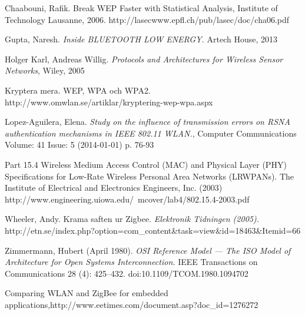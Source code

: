 \documentclass[a4paper,12pt,fleqn]{article}
\begin{document}
Chaabouni, Rafik. Break WEP Faster with Statistical Analysis, Institute of Technology Lausanne, 2006. http://lasecwww.epfl.ch/pub/lasec/doc/cha06.pdf

Gupta, Naresh. \emph{Inside BLUETOOTH LOW ENERGY.} Artech House, 2013

Holger Karl, Andreas Willig. \emph{Protocols and Architectures for Wireless Sensor Networks}, Wiley, 2005

Kryptera mera. WEP, WPA och WPA2. http://www.omwlan.se/artiklar/kryptering-wep-wpa.aspx 

Lopez-Aguilera, Elena. \emph{Study on the influence of transmission errors on RSNA authentication mechanisms in IEEE 802.11 WLAN.}, Computer Communications Volume: 41 Issue: 5 (2014-01-01) p. 76-93

Part 15.4 Wireless Medium Access Control (MAC) and Physical Layer (PHY) Specifications for Low-Rate Wireless Personal Area Networks (LR\text{-}WPANs). The Institute of Electrical and Electronics Engineers, Inc. (2003) \\ http://www.engineering.uiowa.edu/~mcover/lab4/802.15.4-2003.pdf

Wheeler, Andy. Krama saften ur Zigbee. \emph{Elektronik Tidningen (2005).} \\ http://etn.se/index.php?option=com\_content\&task=view\&id=18463\&Itemid=66

Zimmermann, Hubert (April 1980).\emph{ OSI Reference Model — The ISO Model of Architecture for Open Systems Interconnection.} IEEE Transactions on Communications 28 (4): 425–432. doi:10.1109/TCOM.1980.1094702

Comparing WLAN and ZigBee for embedded applications,http://www.eetimes.com/document.asp?doc\_id=1276272
\end{document}
